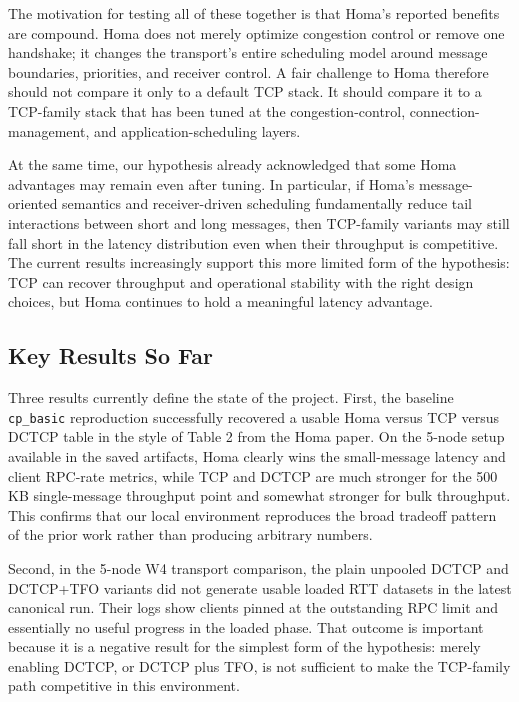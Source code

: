 \documentclass[11pt]{article}
\begin{document}
The motivation for testing all of these together is that Homa's reported benefits are compound. Homa does not merely optimize congestion control or remove one handshake; it changes the transport's entire scheduling model around message boundaries, priorities, and receiver control. A fair challenge to Homa therefore should not compare it only to a default TCP stack. It should compare it to a TCP-family stack that has been tuned at the congestion-control, connection-management, and application-scheduling layers.

At the same time, our hypothesis already acknowledged that some Homa advantages may remain even after tuning. In particular, if Homa's message-oriented semantics and receiver-driven scheduling fundamentally reduce tail interactions between short and long messages, then TCP-family variants may still fall short in the latency distribution even when their throughput is competitive. The current results increasingly support this more limited form of the hypothesis: TCP can recover throughput and operational stability with the right design choices, but Homa continues to hold a meaningful latency advantage.

\subsection{Key Results So Far}

Three results currently define the state of the project. First, the baseline \texttt{cp\_basic} reproduction successfully recovered a usable Homa versus TCP versus DCTCP table in the style of Table 2 from the Homa paper. On the 5-node setup available in the saved artifacts, Homa clearly wins the small-message latency and client RPC-rate metrics, while TCP and DCTCP are much stronger for the 500 KB single-message throughput point and somewhat stronger for bulk throughput. This confirms that our local environment reproduces the broad tradeoff pattern of the prior work rather than producing arbitrary numbers.

Second, in the 5-node W4 transport comparison, the plain unpooled DCTCP and DCTCP+TFO variants did not generate usable loaded RTT datasets in the latest canonical run. Their logs show clients pinned at the outstanding RPC limit and essentially no useful progress in the loaded phase. That outcome is important because it is a negative result for the simplest form of the hypothesis: merely enabling DCTCP, or DCTCP plus TFO, is not sufficient to make the TCP-family path competitive in this environment.
\end{document}
